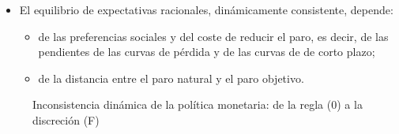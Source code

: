 \documentclass[11pt]{article}
\begin{document}
\begin{itemize}
\begin{enumerate}[label=\roman*)]
\begin{itemize}
    \end{itemize}
  \end{enumerate}
\item El equilibrio de expectativas racionales, dinámicamente consistente, depende:
  \begin{itemize}
  \item de las preferencias sociales y del coste de reducir el paro, es decir, de las pendientes de las curvas de pérdida y de las curvas de  de corto plazo;
  \item de la distancia entre el paro natural y el paro objetivo.
  \end{itemize}
\end{itemize}

\begin{figure}[H]
\centering
\caption{Inconsistencia dinámica de la política monetaria: de la regla (0) a la discreción (F)}\label{fig:barro-gordon}
\end{figure}
\end{document}
